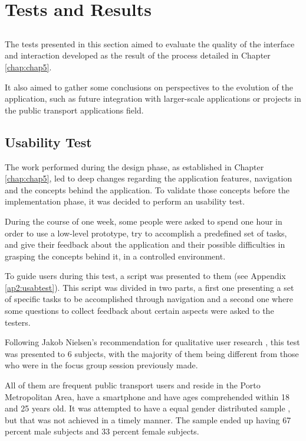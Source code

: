 \chapter{Tests and Results} \label{chap:chap6}

\section*{}

The tests presented in this section aimed to evaluate the quality of the interface and interaction developed as the result of the process detailed in Chapter \ref{chap:chap5}. 

It also aimed to gather some conclusions on perspectives to the evolution of the application, such as future integration with larger-scale applications or projects in the public transport applications field.

\section{Usability Test}

The work performed during the design phase, as established in Chapter \ref{chap:chap5}, led to deep changes regarding the application features, navigation and the concepts behind the application. To validate those concepts before the implementation phase, it was decided to perform an usability test.


During the course of one week, some people were asked to spend one hour in order to use a low-level prototype, try to accomplish a predefined set of tasks, and give their feedback about the application and their possible difficulties in grasping the concepts behind it, in a controlled environment.

To guide users during this test, a script was presented to them (see Appendix \ref{ap2:usabtest}). This script was divided in two parts, a first one presenting a set of specific tasks to be accomplished through navigation and a second one where some questions to collect feedback about certain aspects were asked to the testers.

Following Jakob Nielsen's recommendation for qualitative user research \cite{kn:NB13}, this test was presented to 6 subjects, with the majority of them being different from those who were in the focus group session previously made.

All of them are frequent public transport users and reside in the Porto Metropolitan Area, have a smartphone and have ages comprehended within 18 and 25 years old. It was attempted to have a equal gender distributed sample , but that was not achieved in a timely manner. The sample ended up having 67 percent male subjects and 33 percent female subjects.

